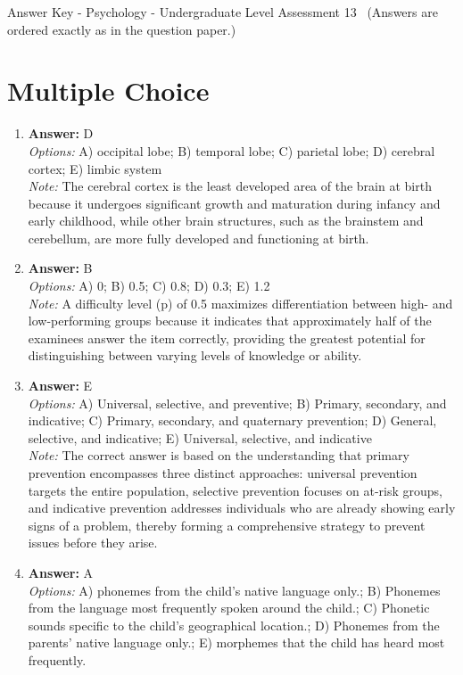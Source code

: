 \documentclass[12pt]{article}
\begin{document}
\begin{center}
Answer Key - Psychology - Undergraduate Level Assessment 13 \
\small (Answers are ordered exactly as in the question paper.)
\end{center}

\section*{Multiple Choice}
\begin{enumerate}[label=\arabic*.]
\item \textbf{Answer:} D
\\ \textit{Options:} A) occipital lobe; B) temporal lobe; C) parietal lobe; D) cerebral cortex; E) limbic system
\\ \textit{Note:} The cerebral cortex is the least developed area of the brain at birth because it undergoes significant growth and maturation during infancy and early childhood, while other brain structures, such as the brainstem and cerebellum, are more fully developed and functioning at birth.
\item \textbf{Answer:} B
\\ \textit{Options:} A) 0; B) 0.5; C) 0.8; D) 0.3; E) 1.2
\\ \textit{Note:} A difficulty level (p) of 0.5 maximizes differentiation between high- and low-performing groups because it indicates that approximately half of the examinees answer the item correctly, providing the greatest potential for distinguishing between varying levels of knowledge or ability.
\item \textbf{Answer:} E
\\ \textit{Options:} A) Universal, selective, and preventive; B) Primary, secondary, and indicative; C) Primary, secondary, and quaternary prevention; D) General, selective, and indicative; E) Universal, selective, and indicative
\\ \textit{Note:} The correct answer is based on the understanding that primary prevention encompasses three distinct approaches: universal prevention targets the entire population, selective prevention focuses on at-risk groups, and indicative prevention addresses individuals who are already showing early signs of a problem, thereby forming a comprehensive strategy to prevent issues before they arise.
\item \textbf{Answer:} A
\\ \textit{Options:} A) phonemes from the child's native language only.; B) Phonemes from the language most frequently spoken around the child.; C) Phonetic sounds specific to the child's geographical location.; D) Phonemes from the parents' native language only.; E) morphemes that the child has heard most frequently.

\end{enumerate}
\end{document}
